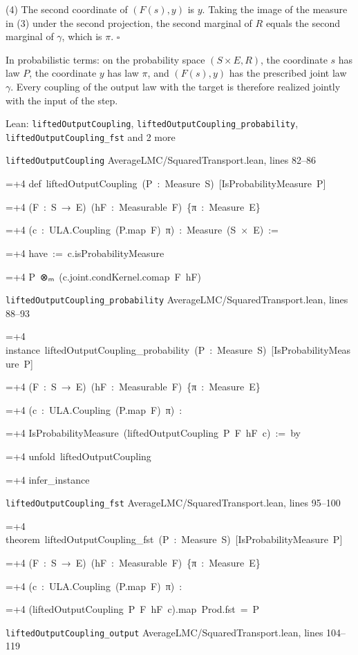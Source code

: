 \documentclass[11pt,a4paper]{report}
\newlength{\leancharwidth}
\newenvironment{leancode}{\par\smallskip\begingroup\ttfamily\footnotesize\raggedright
  \settowidth{\leancharwidth}{M}\setlength{\parskip}{0pt}\setlength{\parindent}{0pt}
  \frenchspacing}{\par\endgroup\smallskip}
\newcommand{\leanline}[2]{\hangindent=\dimexpr#1\leancharwidth+4\leancharwidth\relax
  \hangafter=1\noindent\hspace*{#1\leancharwidth}#2\par}
\newcommand{\leansource}[1]{\par{\footnotesize\color{leanmuted}#1}\par}
\begin{document}
(4) The second coordinate of \((F(s),y)\) is \(y\). Taking the image of the measure in (3) under the second projection, the second marginal of \(R\) equals the second marginal of \(\gamma\), which is \(\pi\). \(\square\)




In probabilistic terms: on the probability space \((S\times E,R)\), the coordinate \(s\) has law \(P\), the coordinate \(y\) has law \(\pi\), and \((F(s),y)\) has the prescribed joint law \(\gamma\). Every coupling of the output law with the target is therefore realized jointly with the input of the step.

\begin{leanbox}{Lean: \texttt{liftedOutputCoupling}, \texttt{liftedOutputCoupling\_\allowbreak{}probability}, \texttt{liftedOutputCoupling\_\allowbreak{}fst} and 2 more}
\leansource{\texttt{liftedOutputCoupling} \quad AverageLMC/\allowbreak{}SquaredTransport.lean, lines 82–86}
\begin{leancode}
\leanline{0}{def\ liftedOutputCoupling\ (P\ :\ Measure\ S)\ [IsProbabilityMeasure\ P]}
\leanline{4}{(F\ :\ S\ →\ E)\ (hF\ :\ Measurable\ F)\ \{π\ :\ Measure\ E\}}
\leanline{4}{(c\ :\ ULA.Coupling\ (P.map\ F)\ π)\ :\ Measure\ (S\ ×\ E)\ :=}
\leanline{2}{have\ :=\ c.isProbabilityMeasure}
\leanline{2}{P\ ⊗ₘ\ (c.joint.condKernel.comap\ F\ hF)}
\end{leancode}
\leansource{\texttt{liftedOutputCoupling\_\allowbreak{}probability} \quad AverageLMC/\allowbreak{}SquaredTransport.lean, lines 88–93}
\begin{leancode}
\leanline{0}{instance\ liftedOutputCoupling\_probability\ (P\ :\ Measure\ S)\ [IsProbabilityMeasure\ P]}
\leanline{4}{(F\ :\ S\ →\ E)\ (hF\ :\ Measurable\ F)\ \{π\ :\ Measure\ E\}}
\leanline{4}{(c\ :\ ULA.Coupling\ (P.map\ F)\ π)\ :}
\leanline{4}{IsProbabilityMeasure\ (liftedOutputCoupling\ P\ F\ hF\ c)\ :=\ by}
\leanline{2}{unfold\ liftedOutputCoupling}
\leanline{2}{infer\_instance}
\end{leancode}
\leansource{\texttt{liftedOutputCoupling\_\allowbreak{}fst} \quad AverageLMC/\allowbreak{}SquaredTransport.lean, lines 95–100}
\begin{leancode}
\leanline{0}{theorem\ liftedOutputCoupling\_fst\ (P\ :\ Measure\ S)\ [IsProbabilityMeasure\ P]}
\leanline{4}{(F\ :\ S\ →\ E)\ (hF\ :\ Measurable\ F)\ \{π\ :\ Measure\ E\}}
\leanline{4}{(c\ :\ ULA.Coupling\ (P.map\ F)\ π)\ :}
\leanline{4}{(liftedOutputCoupling\ P\ F\ hF\ c).map\ Prod.fst\ =\ P}
\end{leancode}
\leansource{\texttt{liftedOutputCoupling\_\allowbreak{}output} \quad AverageLMC/\allowbreak{}SquaredTransport.lean, lines 104–119}

\end{leanbox}
\end{document}
